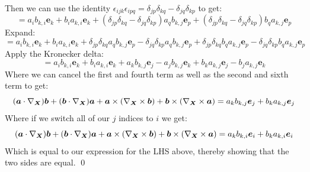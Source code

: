 Then we can use the identity $\epsilon_{ijk}\epsilon_{ipq} = \delta_{jp}\delta_{kq} - \delta_{jq}\delta_{kp}$ to get:
\begin{equation}
    = a_i b_{k,i}\bm{e}_k + b_ia_{k,i}\bm{e}_k + (\delta_{jp}\delta_{kq} - \delta_{jq}\delta_{kp})a_qb_{k,j}\bm{e}_p + (\delta_{jp}\delta_{kq} - \delta_{jq}\delta_{kp})b_qa_{k,j}\bm{e}_p
\end{equation}
Expand:
\begin{equation}
    = a_i b_{k,i}\bm{e}_k + b_ia_{k,i}\bm{e}_k + \delta_{jp}\delta_{kq}a_qb_{k,j}\bm{e}_p - \delta_{jq}\delta_{kp}a_qb_{k,j}\bm{e}_p + \delta_{jp}\delta_{kq}b_qa_{k,j}\bm{e}_p - \delta_{jq}\delta_{kp}b_qa_{k,j}\bm{e}_p
\end{equation}
Apply the Kronecker delta:
\begin{equation}
    = a_i b_{k,i}\bm{e}_k + b_ia_{k,i}\bm{e}_k + a_kb_{k,j}\bm{e}_j - a_jb_{k,j}\bm{e}_k + b_ka_{k,j}\bm{e}_j - b_ja_{k,j}\bm{e}_k
\end{equation}
Where we can cancel the first and fourth term as well as the second and sixth term to get:
\begin{equation}
(\bm{a} \cdot \nabla_{\bm{X}}) \bm{b} + (\bm{b} \cdot \nabla_{\bm{X}}) \bm{a} + \bm{a} \times (\nabla_{\bm{X}} \times \bm{b}) + \bm{b} \times (\nabla_{\bm{X}} \times \bm{a}) = a_kb_{k,j}\bm{e}_j + b_ka_{k,j}\bm{e}_j
\end{equation}
Where if we switch all of our $j$ indices to $i$ we get:
\begin{equation}
(\bm{a} \cdot \nabla_{\bm{X}}) \bm{b} + (\bm{b} \cdot \nabla_{\bm{X}}) \bm{a} + \bm{a} \times (\nabla_{\bm{X}} \times \bm{b}) + \bm{b} \times (\nabla_{\bm{X}} \times \bm{a}) = a_kb_{k,i}\bm{e}_i + b_ka_{k,i}\bm{e}_i
\end{equation}
Which is equal to our expression for the LHS above, thereby showing that the two sides are equal. \qed

